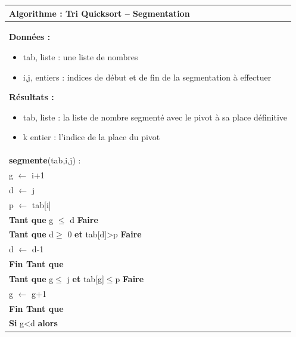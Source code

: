 \documentclass[10pt]{article}
\begin{document}
\begin{pseudo}
\begin{center}
\begin{tabular}{p{}}
\hline
\textbf{Algorithme :} Tri Quicksort -- Segmentation\\
\hline
\textbf{Données :}
\begin{itemize}
\item \textsf{tab}, liste : une liste de nombres
\item \textsf{i,j}, entiers : indices de début et de fin de la segmentation à effectuer
\end{itemize}
\textbf{Résultats :} 
\begin{itemize}
\item \textsf{tab}, liste : la liste de nombre segmenté avec le pivot à sa place définitive
\item \textsf{k} entier : l'indice de la place du pivot
\end{itemize}
\\
\textbf{segmente}(\textsf{tab,i,j}) :\\
\hspace{.4cm} \textsf{g $\leftarrow$ i+1 }\\
\hspace{.4cm} \textsf{d $\leftarrow$ j}\\
\hspace{.4cm} \textsf{p $\leftarrow$ tab[i]}\\
\hspace{.4cm} \textbf{Tant que} \textsf{g $\leq$ d} \textbf{Faire} \\
\hspace{.8cm} \textbf{Tant que} \textsf{d$\geq$ 0} \textbf{et} \textsf{tab[d]>p} \textbf{Faire} \\
\hspace{1.2cm} \textsf{d $\leftarrow$ d-1}\\  
\hspace{.8cm} \textbf{Fin Tant que}  \\
\hspace{.8cm} \textbf{Tant que} \textsf{g$\leq$ j} \textbf{et} \textsf{tab[g]$\leq$p} \textbf{Faire} \\
\hspace{1.2cm} \textsf{g $\leftarrow$ g+1}\\  
\hspace{.8cm} \textbf{Fin Tant que}  \\
\hspace{.8cm} \textbf{Si} \textsf{g<d} \textbf{alors} \\

\end{tabular}
\end{center}
\end{pseudo}
\end{document}
